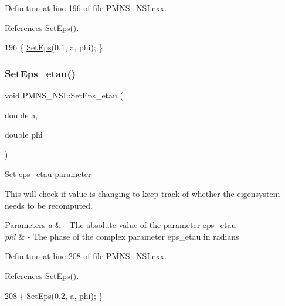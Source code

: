 Definition at line 196 of file P\+M\+N\+S\+\_\+\+N\+S\+I.\+cxx.



References Set\+Eps().


\begin{DoxyCode}
196 \{ \hyperlink{classOscProb_1_1PMNS__NSI_a87c508149ea36b6de493a6817247a0ea}{SetEps}(0,1, a, phi); \}
\end{DoxyCode}
\mbox{\label{classOscProb_1_1PMNS__NSI_a73d43e6d267975d1545af922f8e81bb3}} 
\subsubsection{\texorpdfstring{Set\+Eps\+\_\+etau()}{SetEps\_etau()}}
{\footnotesize\ttfamily void P\+M\+N\+S\+\_\+\+N\+S\+I\+::\+Set\+Eps\+\_\+etau (\begin{DoxyParamCaption}\item[{double}]{a,  }\item[{double}]{phi }\end{DoxyParamCaption})\hspace{0.3cm}{\ttfamily [virtual]}}

Set eps\+\_\+etau parameter

This will check if value is changing to keep track of whether the eigensystem needs to be recomputed.


\begin{DoxyParams}{Parameters}
{\em a} & -\/ The absolute value of the parameter eps\+\_\+etau \\
\hline
{\em phi} & -\/ The phase of the complex parameter eps\+\_\+etau in radians \\
\hline
\end{DoxyParams}


Definition at line 208 of file P\+M\+N\+S\+\_\+\+N\+S\+I.\+cxx.



References Set\+Eps().


\begin{DoxyCode}
208 \{ \hyperlink{classOscProb_1_1PMNS__NSI_a87c508149ea36b6de493a6817247a0ea}{SetEps}(0,2, a, phi); \}
\end{DoxyCode}
\mbox{\label{classOscProb_1_1PMNS__NSI_abf049db9904c745f04346d0d1dedf998}} 
